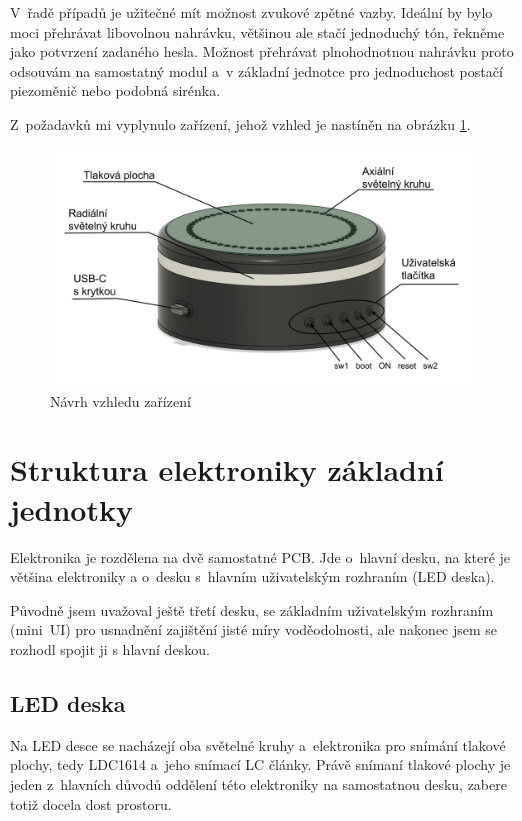 V~řadě případů je užitečné mít možnost zvukové zpětné vazby.
Ideální by bylo moci přehrávat libovolnou nahrávku, většinou ale stačí jednoduchý tón, řekněme jako potvrzení zadaného hesla.
Možnost přehrávat plnohodnotnou nahrávku proto odsouvám na samostatný modul a~v základní jednotce pro jednoduchost postačí piezoměnič nebo podobná sirénka.

Z~požadavků mi vyplynulo zařízení, jehož vzhled je nastíněn na obrázku \ref{fig:AHS-nacrt}.
\begin{figure}
    \centering
    \includegraphics[width=\textwidth]{text/PraktickaCast/img/AHS-nacrt.png}
    \caption{Návrh vzhledu zařízení}
    \label{fig:AHS-nacrt}
\end{figure}

\newpage
\section{Struktura elektroniky základní jednotky}

Elektronika je rozdělena na dvě samostatné PCB.
Jde o~hlavní desku, na které je většina elektroniky a o~desku s~hlavním uživatelským rozhraním (LED deska).

Původně jsem uvažoval ještě třetí desku, se základním uživatelským rozhraním (mini~UI) pro usnadnění zajištění jisté míry voděodolnosti, ale nakonec jsem se rozhodl spojit ji s hlavní deskou.

\subsection{LED deska}
Na LED desce se nacházejí oba světelné kruhy a~elektronika pro snímání tlakové plochy, tedy LDC1614 \cite{LDC1614} a~jeho snímací LC články.
Právě snímaní tlakové plochy je jeden z~hlavních důvodů oddělení této elektroniky na samostatnou desku, zabere totiž docela dost prostoru.

